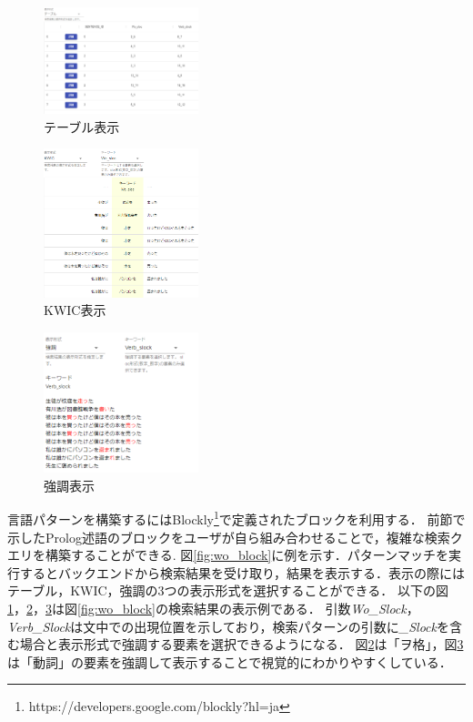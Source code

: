 \documentclass{FITpaper}
\begin{document}
\begin{figure}[htbp]
  \centering
  \includegraphics[width=0.4\textwidth]{fig/table_result.png}
  \caption{テーブル表示}
  \label{fig:table}
\end{figure}

\begin{figure}[htbp]
  \centering
    \includegraphics[width=0.4\textwidth]{fig/KWIC_result.png}
    \caption{KWIC表示}
    \label{fig:KWIC}
\end{figure}


\begin{figure}[htbp]
    \centering
    \includegraphics[width=0.4\textwidth]{fig/acsent_result.png}
    \caption{強調表示}
    \label{fig:acsent}
\end{figure}





言語パターンを構築するにはBlockly\footnote{https://developers.google.com/blockly?hl=ja}で定義されたブロックを利用する．
前節で示したProlog述語のブロックをユーザが自ら組み合わせることで，複雑な検索クエリを構築することができる.
図\ref{fig:wo_block}に例を示す．パターンマッチを実行するとバックエンドから検索結果を受け取り，結果を表示する．表示の際にはテーブル，KWIC，強調の3つの表示形式を選択することができる．
以下の図\ref{fig:table}，\ref{fig:KWIC}，\ref{fig:acsent}は図\ref{fig:wo_block}の検索結果の表示例である．
引数\textit{Wo\_Slock}，\textit{Verb\_Slock}は文中での出現位置を示しており，検索パターンの引数に\textit{\_Slock}を含む場合と表示形式で強調する要素を選択できるようになる．
図\ref{fig:KWIC}は「ヲ格」，図\ref{fig:acsent}は「動詞」の要素を強調して表示することで視覚的にわかりやすくしている．
\end{document}
